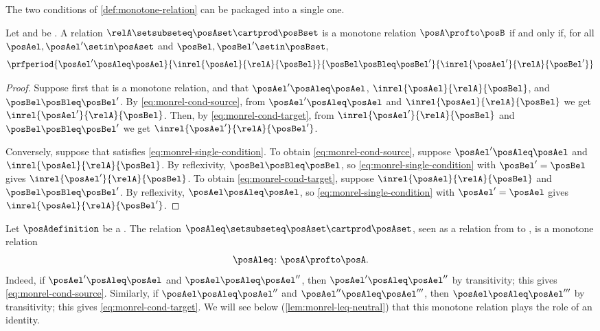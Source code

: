 The two conditions of \cref{def:monotone-relation} can be packaged into a single one.

\begin{lemma}
    \label{lem:monrel-single-condition}
    Let \posA and \posB be .
    A relation $\relA \setsubseteq \posAset \cartprod \posBset$ is a monotone relation $\posA \profto \posB$ if and only if, for all $\posAel, \posAel' \setin \posAset$ and $\posBel, \posBel' \setin \posBset$,
    \begin{equation}\label{eq:monrel-single-condition}
        \prfperiod{
            \posAel' \posAleq \posAel
        }{
            \inrel{\posAel}{\relA}{\posBel}
        }{
            \posBel \posBleq \posBel'
        }{
            \inrel{\posAel'}{\relA}{\posBel'}
        }
    \end{equation}
\end{lemma}
\begin{proof}
    Suppose first that \relA is a monotone relation, and that $\posAel' \posAleq \posAel$, $\inrel{\posAel}{\relA}{\posBel}$, and $\posBel \posBleq \posBel'$.
    By \cref{eq:monrel-cond-source}, from $\posAel' \posAleq \posAel$ and $\inrel{\posAel}{\relA}{\posBel}$ we get $\inrel{\posAel'}{\relA}{\posBel}$.
    Then, by \cref{eq:monrel-cond-target}, from $\inrel{\posAel'}{\relA}{\posBel}$ and $\posBel \posBleq \posBel'$ we get $\inrel{\posAel'}{\relA}{\posBel'}$.

    Conversely, suppose that \relA satisfies \cref{eq:monrel-single-condition}.
    To obtain \cref{eq:monrel-cond-source}, suppose $\posAel' \posAleq \posAel$ and $\inrel{\posAel}{\relA}{\posBel}$.
    By reflexivity, $\posBel \posBleq \posBel$, so \cref{eq:monrel-single-condition} with $\posBel' = \posBel$ gives $\inrel{\posAel'}{\relA}{\posBel}$.
    To obtain \cref{eq:monrel-cond-target}, suppose $\inrel{\posAel}{\relA}{\posBel}$ and $\posBel \posBleq \posBel'$.
    By reflexivity, $\posAel \posAleq \posAel$, so \cref{eq:monrel-single-condition} with $\posAel' = \posAel$ gives $\inrel{\posAel}{\relA}{\posBel'}$.
\end{proof}

\begin{example}
    \label{exa:monrel-leq}
    Let $\posAdefinition$ be a .
    The relation $\posAleq \setsubseteq \posAset \cartprod \posAset$, seen as a relation from \posA to \posA, is a monotone relation
    \begin{equation}
        \posAleq \colon \posA \profto \posA.
    \end{equation}
    Indeed, if $\posAel' \posAleq \posAel$ and $\posAel \posAleq \posAel''$, then $\posAel' \posAleq \posAel''$ by transitivity; this gives \cref{eq:monrel-cond-source}.
    Similarly, if $\posAel \posAleq \posAel''$ and $\posAel'' \posAleq \posAel'''$, then $\posAel \posAleq \posAel'''$ by transitivity; this gives \cref{eq:monrel-cond-target}.
    We will see below (\cref{lem:monrel-leq-neutral}) that this monotone relation plays the role of an identity.
\end{example}

